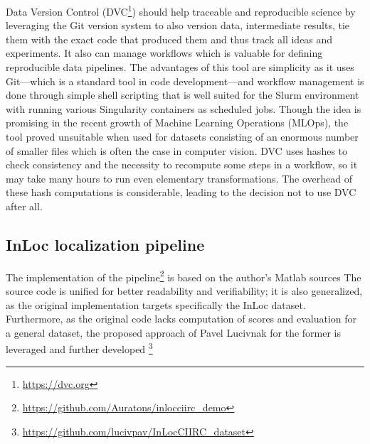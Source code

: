 Data Version Control (DVC\footnote{\url{https://dvc.org}}) should help traceable and
reproducible science by leveraging the Git version system to also version data,
intermediate results, tie them with the exact code that produced them and thus track all
ideas and experiments. It also can manage workflows which is valuable for defining
reproducible data pipelines. The advantages of this tool are simplicity as it uses
Git---which is a standard tool in code development---and workflow management is done
through simple shell scripting that is well suited for the Slurm environment with running
various Singularity containers as scheduled jobs. Though the idea is promising in the
recent growth of Machine Learning Operations (MLOps), the tool proved unsuitable when used
for datasets consisting of an enormous number of smaller files which is often the case in
computer vision. DVC uses hashes to check consistency and the necessity to recompute some
steps in a workflow, so it may take many hours to run even elementary transformations.
The overhead of these hash computations is considerable, leading to the decision not to
use DVC after all.

\subsection{InLoc localization pipeline} \label{subsec:inloc}

The implementation of the
pipeline\footnote{\url{https://github.com/Auratons/inlocciirc_demo}} is based on the
author's Matlab sources The
source code is unified for better readability and verifiability; it is also generalized,
as the original implementation targets specifically the InLoc
dataset. Furthermore, as
the original code lacks computation of scores and evaluation for a general dataset, the
proposed approach of Pavel Lucivnak for the former is leveraged and further
developed
\footnote{\url{https://github.com/lucivpav/InLocCIIRC_dataset}}

